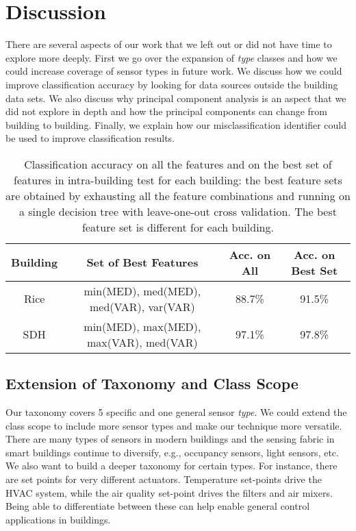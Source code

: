 \section{Discussion}
There are several aspects of our work that we left out or did not have time to explore more deeply.
First we go over the expansion of \emph{type} classes and how we could increase coverage of sensor types in future work. 
We discuss how we could improve classification accuracy
by looking for data sources outside the building data sets. We also discuss why principal component analysis is an aspect that we
did not explore in depth and how the principal components can change from building to building.  Finally, we 
explain how our misclassification identifier could be used to improve classification results.

\begin{table*}
    \centering %
    \begin{tabular}{c|c|c|c}%
        \hline %
        Building & Set of Best Features & Acc. on All & Acc. on Best Set \\ %
        \hline\hline %
        Rice & min(MED), med(MED), med(VAR), var(VAR) & 88.7\% & 91.5\% \\ \hline
        SDH & min(MED), max(MED), max(VAR), med(VAR) & 97.1\% & 97.8\% \\\hline
    \end{tabular}
    \caption{Classification accuracy on all the features and on the best set of features in intra-building test for each building: the best feature sets are obtained by exhausting all the feature combinations and running on a single decision tree with leave-one-out cross validation. The best feature set is different for each building.}
    \label{table:feature} %
\end{table*}

\subsection{Extension of Taxonomy and Class Scope}
Our taxonomy covers 5 specific and one general sensor \emph{type}. We could extend the class scope to include more sensor types and make our technique more versatile. There are many types of sensors in modern buildings and the sensing fabric in smart buildings continue to diversify, e.g., occupancy sensors, light sensors, etc. We also want to build a deeper taxonomy for certain types.  
For instance, there are set points for very different actuators.  Temperature set-points drive the HVAC system, while the air quality set-point drives the filters and air mixers. Being able to differentiate between these can help enable general control applications in buildings.

